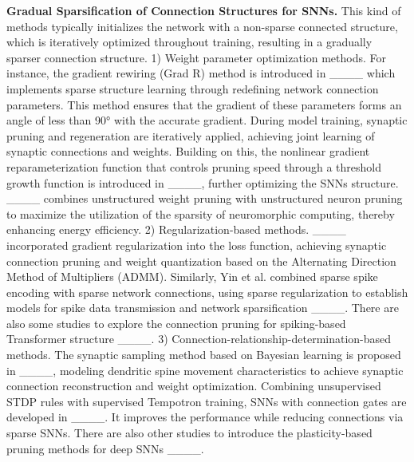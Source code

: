 \textbf{Gradual Sparsification of Connection Structures for SNNs.} This kind of methods typically initializes the network with a non-sparse connected structure, which is iteratively optimized throughout training, resulting in a gradually sparser connection structure.
1) Weight parameter optimization methods. For instance, the gradient rewiring (Grad R) method is introduced in  ____ which implements sparse structure learning through redefining network connection parameters. This method ensures that the gradient of these parameters forms an angle of less than 90° with the accurate gradient. During model training, synaptic pruning and regeneration are iteratively applied, achieving joint learning of synaptic connections and weights. Building on this, the nonlinear gradient reparameterization function that controls pruning speed through a threshold growth function is introduced in ____, further optimizing the SNNs structure. ____ combines unstructured weight pruning with unstructured neuron
pruning to maximize the utilization of the sparsity of neuromorphic computing,
thereby enhancing energy efficiency. 
2) Regularization-based methods. ____ incorporated gradient regularization into the loss function, achieving synaptic connection pruning and weight quantization based on the Alternating Direction Method of Multipliers (ADMM). Similarly, Yin et al. combined sparse spike encoding with sparse network connections, using sparse regularization to establish models for spike data transmission and network sparsification ____. There are also some studies to explore the connection pruning for spiking-based Transformer structure ____.
3) Connection-relationship-determination-based methods.
The synaptic sampling method based on Bayesian learning is proposed in ____, modeling dendritic spine movement characteristics to achieve synaptic connection reconstruction and weight optimization. Combining unsupervised STDP rules with supervised Tempotron training, SNNs with connection gates are developed in ____. It improves the performance while reducing connections via sparse SNNs. There are also other studies to introduce the plasticity-based pruning methods for deep SNNs ____.

